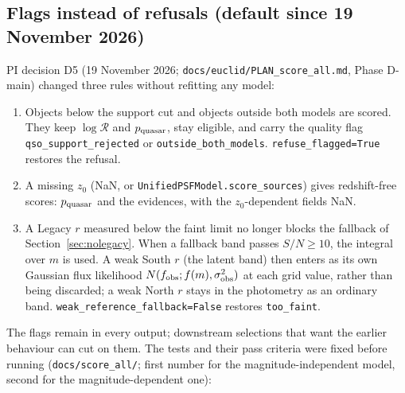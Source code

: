 \documentclass[11pt,a4paper]{article}
\newcommand{\R}{\mathcal{R}}
\newcommand{\code}[1]{\texttt{#1}}
\begin{document}
\subsection{Flags instead of refusals (default since 19 November 2026)}\label{sec:flags}
PI decision D5 (19 November 2026; \code{docs/euclid/PLAN\_score\_all.md}, Phase D-main) changed three rules
without refitting any model:
\begin{enumerate}\sloppy
\item Objects below the support cut and objects outside both models are scored. They keep $\log\R$ and
  $p_{\rm quasar}$, stay eligible, and carry the quality flag \code{qso\_support\_rejected} or
  \code{outside\_both\_models}. \code{refuse\_flagged=True} restores the refusal.
\item A missing $z_0$ (NaN, or \code{UnifiedPSFModel.score\_sources}) gives redshift-free scores: $p_{\rm quasar}$
  and the evidences, with the $z_0$-dependent fields NaN.
\item A Legacy $r$ measured below the faint limit no longer blocks the fallback of Section~\ref{sec:nolegacy}.
  When a fallback band passes $S/N\geq10$, the integral over $m$ is used. A weak South $r$ (the latent band)
  then enters as its own Gaussian flux likelihood $N(f_{\rm obs};f(m),\sigma_{\rm obs}^2)$ at each grid value,
  rather than being discarded; a weak North $r$ stays in the photometry as an ordinary band.
  \code{weak\_reference\_fallback=False} restores \code{too\_faint}.
\end{enumerate}
The flags remain in every output; downstream selections that want the earlier behaviour can cut on them.
The tests and their pass criteria were fixed before running (\code{docs/score\_all/}; first number for the
magnitude-independent model, second for the magnitude-dependent one):
\end{document}
